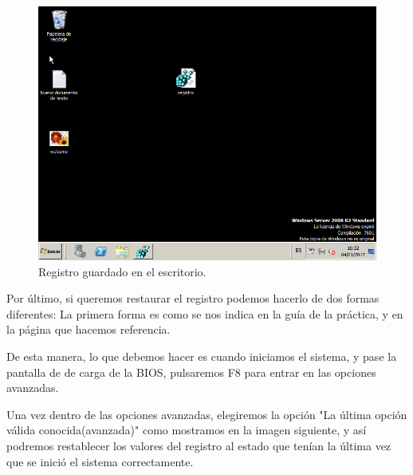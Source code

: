 \begin{figure}[H] %
	\centering
	\includegraphics[scale=0.5]{imagenes/reg_guardado.png}  %
	\caption{Registro guardado en el escritorio.} \label{fig:figura8}
\end{figure}

Por último, si queremos restaurar el registro podemos hacerlo de dos formas diferentes:
La primera forma es como se nos indica en la guía de la práctica, y en la página que hacemos referencia. \cite{restf8}

De esta manera, lo que debemos hacer es cuando iniciamos el sistema, y pase la pantalla de de carga de la BIOS, pulsaremos F8 para entrar en las opciones avanzadas.

Una vez dentro de las opciones avanzadas, elegiremos la opción "La última opción válida conocida(avanzada)" como mostramos en la imagen siguiente, y así podremos restablecer los valores del registro al estado que tenían la última vez que se inició el sistema correctamente.


